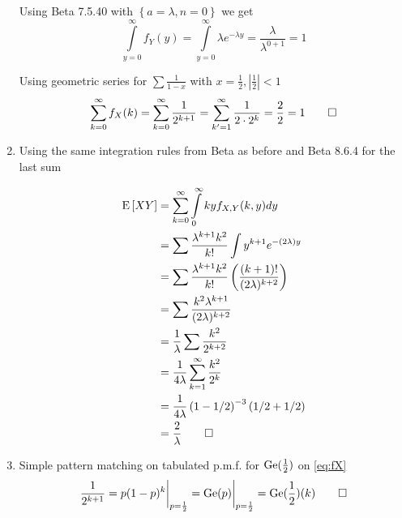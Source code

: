 \documentclass[a4paper,twoside=false,abstract=false,numbers=noenddot,
titlepage=false,headings=small,parskip=half,version=last]{scrartcl}
\begin{document}
\begin{solution}
\begin{enumerate}
            Using Beta 7.5.40 with $\left\{a=\lambda, n=0\right\}$ we get
            \begin{equation}
                \int\limits_{y=0}^\infty f_Y(y) = \int\limits_{y=0}^\infty
                \lambda e^{-\lambda y}= \frac{\lambda}{\lambda^{0+1}}
                = 1
            \end{equation}

            Using geometric series for $\sum\frac{1}{1-x}$ with $x=\frac{1}{2}, |\frac{1}{2}|<1$
            \begin{equation}
                \sum\limits_{k=0}^\infty f_X(k) =
                \sum\limits_{k=0}^\infty \frac{1}{2^{k+1}} =
                \sum\limits_{k'=1}^\infty \frac{1}{2\cdot2^k} = \frac{2}{2} = 1
                \qed
            \end{equation}

        \item Using the same integration rules from Beta as before and Beta
            8.6.4 for the last sum

            \begin{align}
                {\rm E}\,[XY] & =
                \sum\limits_{k=0}^\infty \int\limits_0^\infty kyf_{X,Y}(k,y)dy
                \nonumber \\ & =
                \sum\frac{\lambda^{k+1}k^2}{k!} \int y^{k+1} e^{-(2\lambda)y}
                \nonumber \\ & =
                \sum\frac{\lambda^{k+1}k^2}{k!}
                \left(\frac{(k+1)!}{(2\lambda)^{k+2}}\right)
                \nonumber \\ & =
                \sum\frac{k^2\lambda^{k+1}}{(2\lambda)^{k+2}}
                \nonumber \\ & =
                \frac{1}{\lambda}\sum\frac{k^2}{2^{k+2}}
                \nonumber \\ & =
                \frac{1}{4\lambda}\sum\limits_{k=1}^\infty \frac{k^2}{2^k}
                \nonumber \\ & =
                \frac{1}{4\lambda}\left(1-1/2\right)^{-3}(1/2+1/2)
                \nonumber \\ & = \frac{2}{\lambda} \qed
            \end{align}

        \item Simple pattern matching on tabulated p.m.f. for
            $\text{Ge}(\frac{1}{2})$ on \eqref{eq:fX}
            \begin{equation}
                \frac{1}{2^{k+1}} =
                {p(1-p)^k}\bigg|_{p=\frac{1}{2}} =
                {\text{Ge}(p)}\bigg|_{p=\frac{1}{2}} =
                \text{Ge}(\frac{1}{2})(k) \qed
            \end{equation}


\end{enumerate}
\end{solution}
\end{document}
